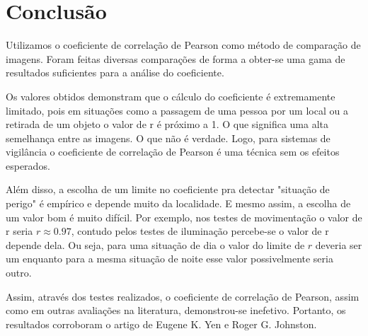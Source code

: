 \documentclass[10pt,a4paper]{article}
\begin{document}
\newpage
\section{Conclusão}
Utilizamos o coeficiente de correlação de Pearson  
como método de comparação de imagens. Foram feitas diversas
comparações de forma a obter-se uma gama de resultados suficientes
para a análise do coeficiente.

Os valores obtidos demonstram que o cálculo do coeficiente é
extremamente limitado, pois em situações como a passagem de uma pessoa
por um local ou a retirada de um objeto o valor de r é próximo a 1. O
que significa uma alta semelhança entre as imagens. O que não é
verdade. Logo, para sistemas de vigilância o coeficiente de correlação
de Pearson é uma técnica sem os efeitos esperados.

Além disso, a escolha de um limite no coeficiente pra detectar "situação de
perigo" é empírico e depende muito da localidade. E mesmo assim, a
escolha de um valor bom é muito difícil. Por exemplo, nos testes de
movimentação o valor de r seria $r \approx0.97$, contudo pelos testes
de iluminação percebe-se o valor de r depende dela. Ou seja, para uma
situação de dia o valor do limite de $r$ deveria ser um enquanto para
a mesma situação de noite esse valor possivelmente seria outro.
 
Assim, através dos testes realizados, o coeficiente de correlação de Pearson, assim como em outras
avaliações na literatura, demonstrou-se inefetivo. Portanto, os
resultados corroboram o artigo de Eugene K. Yen e
Roger G. Johnston.





\begin{small}
  
\end{small}
\end{document}
